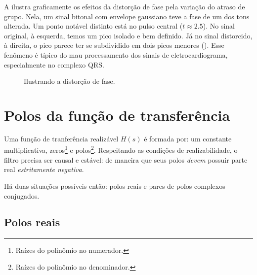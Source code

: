 A  ilustra graficamente os efeitos da distorção de fase pela variação do atraso de grupo. Nela, um sinal bitonal com envelope gaussiano teve a fase de um dos tons alterada. Um ponto notável distinto está no pulso central ($t\approx\num{2.5}$). No sinal original, à esquerda, temos um pico isolado e bem definido. Já no sinal distorcido, à direita, o pico parece ter se subdividido em dois picos menores (). Esse fenômeno é típico do mau processamento dos sinais de eletrocardiograma, especialmente no complexo QRS.

\begin{figure}[ht]
	\centering
	\caption{Ilustrando a distorção de fase.}
	\label{fig:dist}
\end{figure}

\section{Polos da função de transferência}

Uma função de tranferência realizável $H(s)$ é formada por: um constante multiplicativa, zeros\footnote{Raízes do polinômio no numerador.} e polos\footnote{Raízes do polinômio no denominador.}. Respeitando as condições de realizabilidade, o filtro precisa ser causal e estável: de maneira que seus polos \emph{devem} possuir parte real \emph{estritamente negativa}.

Há duas situações possíveis então: polos reais e pares de polos complexos conjugados.

\subsection{Polos reais}

